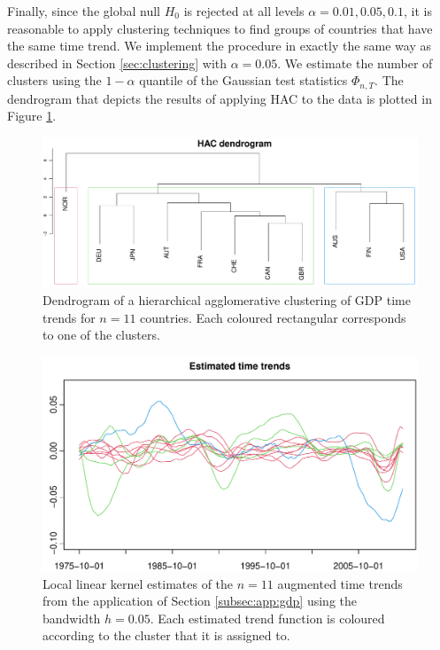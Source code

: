 \documentclass[a4paper,12pt]{article}
\begin{document}
Finally, since the global null $H_0$ is rejected at all levels $\alpha = 0.01, 0.05, 0.1$, it is reasonable to apply clustering techniques to find groups of countries that have the same time trend. We implement the procedure in exactly the same way as described in Section \ref{sec:clustering} with $\alpha = 0.05$. We estimate the number of clusters using the $1- \alpha$ quantile of the Gaussian test statistics $\Phi_{n, T}$. The dendrogram that depicts the results of applying HAC to the data is plotted in Figure \ref{fig:gdp:dend}. 

\begin{figure}[t!]
\includegraphics[width=\textwidth]{output/plots/gdp/gdp_dendrogram}
\caption{Dendrogram of a hierarchical agglomerative clustering of GDP time trends for $n = 11$ countries.  Each coloured rectangular corresponds to one of the clusters.}\label{fig:gdp:dend}
\end{figure}

\begin{figure}[t!]
\includegraphics[width=\textwidth]{output/plots/gdp/gdp_all_clusters}
\caption{Local linear kernel estimates of the $n=11$ augmented time trends from the application of Section \ref{subsec:app:gdp} using the bandwidth $h = 0.05$. Each estimated trend function is coloured according to the cluster that it is assigned to.}\label{fig:gdp:all_clusters}
\end{figure}
\end{document}
